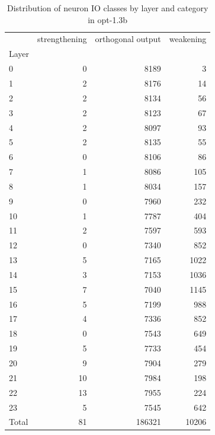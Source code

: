 \begin{table}
\caption{Distribution of neuron IO classes by layer and category in opt-1.3b}
\label{tab:opt-1.3b}
\begin{tabular}{lrrr}
 & strengthening & orthogonal output & weakening \\
Layer &  &  &  \\
0 & 0 & 8189 & 3 \\
1 & 2 & 8176 & 14 \\
2 & 2 & 8134 & 56 \\
3 & 2 & 8123 & 67 \\
4 & 2 & 8097 & 93 \\
5 & 2 & 8135 & 55 \\
6 & 0 & 8106 & 86 \\
7 & 1 & 8086 & 105 \\
8 & 1 & 8034 & 157 \\
9 & 0 & 7960 & 232 \\
10 & 1 & 7787 & 404 \\
11 & 2 & 7597 & 593 \\
12 & 0 & 7340 & 852 \\
13 & 5 & 7165 & 1022 \\
14 & 3 & 7153 & 1036 \\
15 & 7 & 7040 & 1145 \\
16 & 5 & 7199 & 988 \\
17 & 4 & 7336 & 852 \\
18 & 0 & 7543 & 649 \\
19 & 5 & 7733 & 454 \\
20 & 9 & 7904 & 279 \\
21 & 10 & 7984 & 198 \\
22 & 13 & 7955 & 224 \\
23 & 5 & 7545 & 642 \\
Total & 81 & 186321 & 10206 \\
\end{tabular}
\end{table}
